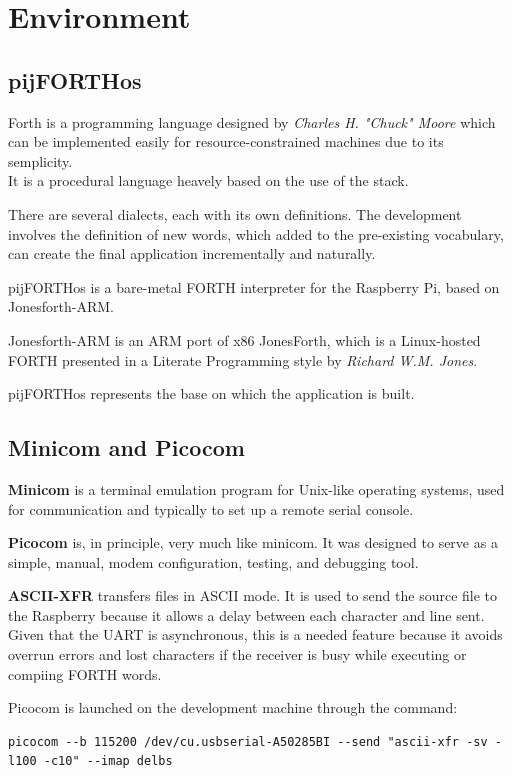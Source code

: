\documentclass[a4paper, 12pt]{article}
\begin{document}
\section{Environment}

\subsection{pijFORTHos}
Forth is a programming language designed by \textit{Charles H. "Chuck" Moore} which can be implemented easily for resource-constrained machines due to its semplicity. \\
It is a procedural language heavely based on the use of the stack.

There are several dialects, each with its own definitions. The development involves the definition of new words, which added to the pre-existing vocabulary, can create the final application incrementally and naturally.

pijFORTHos\cite{pijFORTHos} is a bare-metal FORTH interpreter for the Raspberry Pi, based on Jonesforth-ARM. 

Jonesforth-ARM\cite{JonesforthARM} is an ARM port of x86 JonesForth, which is a Linux-hosted FORTH presented in a Literate Programming style by \textit{Richard W.M. Jones}.

pijFORTHos represents the base on which the application is built.

\subsection{Minicom and Picocom}
\textbf{Minicom}\cite{minicom} is a terminal emulation program for Unix-like operating systems, used for communication and typically to set up a remote serial console.

\textbf{Picocom}\cite{picocom} is, in principle, very much like minicom. It was designed to serve as a simple, manual, modem configuration, testing, and debugging tool.

\textbf{ASCII-XFR}\cite{ASCIIXFR} transfers files in ASCII mode. It is used to send the source file to the Raspberry because it
allows a delay between each character and line sent. \\
Given that the UART is asynchronous, this is a needed feature because it avoids overrun errors and lost characters if the receiver is busy while executing or compiing FORTH words.

Picocom is launched on the development machine through the command:
\begin{Verbatim}[breaklines=true, breakanywhere=true]
    picocom --b 115200 /dev/cu.usbserial-A50285BI --send "ascii-xfr -sv -l100 -c10" --imap delbs
\end{Verbatim}
\end{document}
